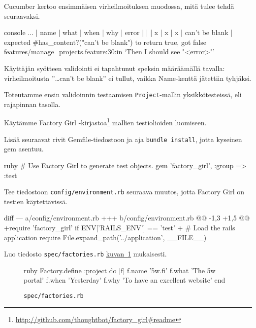 \documentclass{article}
\newenvironment{myfigure}[1][tbp]{
  \begin{figure}[#1]
    \centering
    \begin{lrbox}{\myfigurebox}
      \begin{minipage}{\textwidth}
}{
      \end{minipage}
    \end{lrbox}
    \colorbox{blue!4}{\usebox{\myfigurebox}}
  \end{figure}
}
\newcommand{\myref}[2]{\hyperref[#2]{#1~\ref*{#2}}}
\newcommand{\pdfforeignlanguage}[2]{\texorpdfstring{\foreignlanguage{#1}{#2}}{#2}}
\newcommand{\eng}[1]{\pdfforeignlanguage{english}{#1}}
\begin{document}
\begin{samepage}
Cucumber kertoo ensimmäisen virheilmoituksen muodossa, mitä tulee tehdä
seuraavaksi.

\begin{pygmented}{console}
...
      | name | what | when | why | error          |
      |      | x    | x    | x   | can't be blank |
      expected #has_content?("can't be blank") to return true, got false
      features/manage_projects.feature:30:in `Then I should see "<error>"'
\end{pygmented}
\end{samepage}

Käyttäjän syötteen validointi ei tapahtunut speksin määräämällä tavalla:
virheilmoitusta ''\eng{\dots can't be blank}'' ei tullut, vaikka Name-kenttä
jätettiin tyhjäksi.

Toteutamme ensin validoinnin testaamisen \texttt{Project}-mallin
yksikkötesteissä, eli rajapinnan tasolla.

Käytämme Factory Girl
-kirjastoa\footnote{\url{http://github.com/thoughtbot/factory\_girl\#readme}}
mallien testiolioiden luomiseen.

\begin{samepage}
Lisää seuraavat rivit Gemfile-tiedostoon ja aja \texttt{bundle install}, jotta
kyseinen gem asentuu.

\begin{pygmented}{ruby}
# Use Factory Girl to generate test objects.
gem 'factory_girl', :group => :test
\end{pygmented}
\end{samepage}

\begin{samepage}
Tee tiedostoon \texttt{config/environment.rb} seuraava muutos, jotta Factory
Girl on testien käytettävissä.

\begin{pygmented}{diff}
--- a/config/environment.rb
+++ b/config/environment.rb
@@ -1,3 +1,5 @@
+require 'factory_girl' if ENV['RAILS_ENV'] == 'test'
+
 # Load the rails application
 require File.expand_path('../application', __FILE__)
 
\end{pygmented}
\end{samepage}

\begin{samepage}
Luo tiedosto \texttt{spec/factories.rb} \myref{kuvan}{fig:factories-00-project}
mukaisesti.

\begin{myfigure}[H]
\caption{\texttt{spec/factories.rb}}
\label{fig:factories-00-project}

\begin{pygmented}{ruby}
Factory.define :project do |f|
  f.name '5w.fi'
  f.what 'The 5w portal'
  f.when 'Yesterday'
  f.why  'To have an excellent website'
end
\end{pygmented}
\end{myfigure}
\end{samepage}
\end{document}
